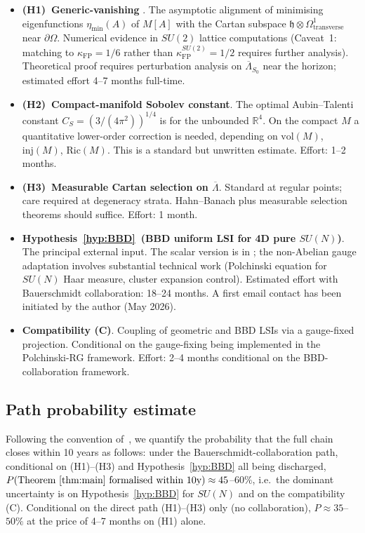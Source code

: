 \documentclass[11pt,a4paper]{amsart}
\theoremstyle{definition}
\newcommand{\R}{\mathbb{R}}
\newcommand{\hfrak}{\mathfrak{h}}
\newcommand{\kFP}{\kappa_{\mathrm{FP}}}
\begin{document}
\begin{itemize}[leftmargin=2em]
\item \textbf{(H1)~Generic-vanishing} \cite{RemondiereKRFP3_2026}.
The asymptotic alignment of minimising eigenfunctions
$\eta_\mathrm{min}(A)$ of $M[A]$ with the Cartan subspace
$\hfrak\otimes\Omega^1_\mathrm{transverse}$ near $\partial\Omega$.
Numerical evidence in $SU(2)$ lattice computations
\cite[Table~1 ($SU(2)$ lattice)]{RemondiereKRFP3_2026} (Caveat~1: matching
to $\kFP = 1/6$ rather than $\kFP^{SU(2)} = 1/2$ requires further analysis).
Theoretical proof requires perturbation analysis on $\overline\Lambda_{S_0}$
near the horizon; estimated effort 4--7 months full-time.

\item \textbf{(H2)~Compact-manifold Sobolev constant}. The optimal
Aubin--Talenti constant $C_S = (3/(4\pi^2))^{1/4}$ is for the unbounded
$\R^4$. On the compact $M$ a quantitative lower-order correction is needed,
depending on $\mathrm{vol}(M)$, $\mathrm{inj}(M)$, $\mathrm{Ric}(M)$.
This is a standard but unwritten estimate. Effort: 1--2 months.

\item \textbf{(H3)~Measurable Cartan selection on $\overline\Lambda$}.
Standard at regular points; care required at degeneracy strata. Hahn--Banach
plus measurable selection theorems should suffice. Effort: 1 month.

\item \textbf{Hypothesis~\ref{hyp:BBD}~(BBD uniform LSI for 4D pure $SU(N)$)}.
The principal external input. The scalar version is in
\cite{BauerschmidtDagallier2024}; the non-Abelian gauge adaptation
involves substantial technical work (Polchinski equation for $SU(N)$ Haar
measure, cluster expansion control). Estimated effort with Bauerschmidt
collaboration: 18--24 months. A first email contact has been initiated
by the author (May 2026).

\item \textbf{Compatibility (C)}. Coupling of geometric and BBD LSIs via
a gauge-fixed projection. Conditional on the gauge-fixing being implemented
in the Polchinski-RG framework. Effort: 2--4 months conditional on the
BBD-collaboration framework.
\end{itemize}

\subsection{Path probability estimate}
Following the convention of~\cite[Tab.~IV]{RemondiereMassGapPRL_2026}, we
quantify the probability that the full chain closes within 10 years as
follows: under the Bauerschmidt-collaboration path, conditional on
(H1)--(H3) and Hypothesis~\ref{hyp:BBD} all being discharged,
$P(\text{Theorem~\ref{thm:main} formalised within 10y}) \approx 45$--$60\%$,
i.e.\ the dominant uncertainty is on Hypothesis~\ref{hyp:BBD} for $SU(N)$
and on the compatibility (C). Conditional on the direct path (H1)--(H3) only
(no collaboration), $P \approx 35$--$50\%$ at the price of 4--7 months on
(H1) alone.
\end{document}
